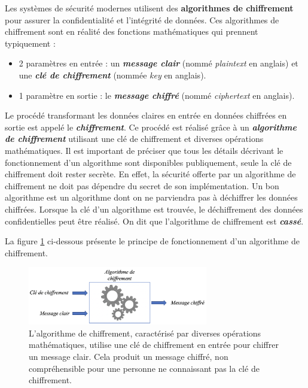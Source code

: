 \documentclass[oneside]{book}
\begin{document}
Les systèmes de sécurité modernes utilisent des \textbf{algorithmes de chiffrement} pour assurer la confidentialité et l'intégrité de données. Ces algorithmes de chiffrement sont en réalité des fonctions mathématiques qui prennent typiquement : 
\begin{itemize}
\item  2 paramètres en entrée : un \textbf{\textit{message clair}} (nommé \textit{plaintext} en anglais) et une \textbf{\textit{clé de chiffrement}} (nommée \textit{key} en anglais).
\item 1 paramètre en sortie : le \textbf{\textit{message chiffré}} (nommé \textit{ciphertext} en anglais). \\
\end{itemize}
Le procédé transformant les données claires en entrée en données chiffrées en sortie est appelé le \textbf{\textit{chiffrement}}.
Ce procédé est réalisé grâce à un \textbf{\textit{algorithme de chiffrement}} utilisant une clé de chiffrement et diverses opérations mathématiques. Il est important de préciser que tous les détails décrivant le fonctionnement d'un algorithme sont disponibles publiquement, seule la clé de chiffrement doit rester secrète. En effet, la sécurité offerte par un algorithme de chiffrement ne doit pas dépendre du secret de son implémentation. Un bon algorithme est un algorithme dont on ne parviendra pas à déchiffrer les données chiffrées. Lorsque la clé d'un algorithme est trouvée, le déchiffrement des données confidentielles peut être réalisé. On dit que l'algorithme de chiffrement est \textbf{\textit{cassé}}.

\hspace{-0.5 cm}La figure \ref{fig:chiffrement} ci-dessous présente le principe de fonctionnement d'un algorithme de chiffrement.

\begin{figure}[htbp]
    \centering
    \includegraphics[width=0.7\textwidth]{image/chiffrement}
    \caption{L'algorithme de chiffrement, caractérisé par diverses opérations mathématiques, utilise une clé de chiffrement en entrée pour chiffrer un message clair. Cela produit un message chiffré, non compréhensible pour une personne ne connaissant pas la clé de chiffrement.}
    \label{fig:chiffrement}
\end{figure}
\end{document}
